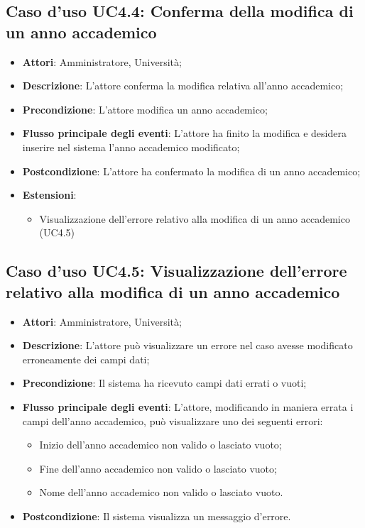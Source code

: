 \subsection{Caso d'uso \texorpdfstring{UC4.4}{UC4.4}: Conferma della modifica di un anno accademico}
\begin{itemize}
\item \textbf{Attori}: Amministratore, Università;
\item \textbf{Descrizione}: L'attore conferma la modifica relativa all'anno accademico;
\item \textbf{Precondizione}: L'attore modifica un anno accademico;
\item \textbf{Flusso principale degli eventi}: L'attore ha finito la modifica e desidera inserire nel sistema l'anno accademico modificato;
\item \textbf{Postcondizione}: L'attore ha confermato la modifica di un anno accademico;
\item \textbf{Estensioni}:
\begin{itemize}
\item Visualizzazione dell'errore relativo alla modifica di un anno accademico (UC4.5)
\end{itemize}
\end{itemize}
\subsection{Caso d'uso \texorpdfstring{UC4.5}{UC4.5}: Visualizzazione dell'errore relativo alla modifica di un anno accademico}
\begin{itemize}
\item \textbf{Attori}: Amministratore, Università;
\item \textbf{Descrizione}: L'attore può visualizzare un errore nel caso avesse modificato erroneamente dei campi dati;
\item \textbf{Precondizione}: Il sistema ha ricevuto campi dati errati o vuoti;
\item \textbf{Flusso principale degli eventi}: L'attore, modificando in maniera errata i campi dell'anno accademico, può visualizzare uno dei seguenti errori: 
\begin{itemize}
\item Inizio dell'anno accademico non valido o lasciato vuoto; 
\item Fine dell'anno accademico non valido o lasciato vuoto; 
\item Nome dell'anno accademico non valido o lasciato vuoto. 
\end{itemize}
\item \textbf{Postcondizione}: Il sistema visualizza un messaggio d'errore.
\end{itemize}
